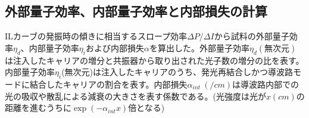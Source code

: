 \clearpage
\subsection{外部量子効率、内部量子効率と内部損失の計算}%
ILカーブの発振時の傾きに相当するスロープ効率$\Delta P/\Delta I$から試料の外部量子効率$\eta_{d}$、内部量子効率$\eta_{i}$および内部損失$\alpha$を算出した。外部量子効率$\eta_{d}(無次元)$は注入したキャリアの増分と共振器から取り出された光子数の増分の比を表す。内部量子効率$\eta_{i}$(無次元)は注入したキャリアのうち、発光再結合しかつ導波路モードに結合したキャリアの割合を表す。内部損失$\alpha_{int}\ (\si{/cm})$は導波路内部での光の吸収や散乱による減衰の大きさを表す係数である。(光強度は光が$x\si{(cm)}$の距離を進むうちに$\exp(-\alpha_{int} x)$倍となる)

